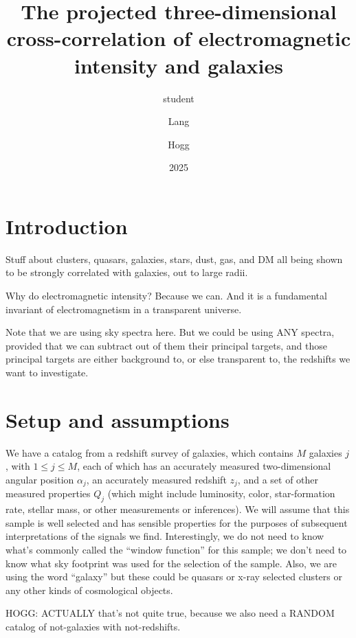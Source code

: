 \documentclass{article}
\title{\bfseries%
The projected three-dimensional cross-correlation of electromagnetic intensity and galaxies}
\author{student \and Lang \and Hogg}
\date{2025}
\begin{document}
\maketitle

\section{Introduction}
Stuff about clusters, quasars, galaxies, stars, dust, gas, and DM all being shown to be strongly correlated with galaxies, out to large radii.

Why do electromagnetic intensity? Because we can. And it is a fundamental invariant of electromagnetism in a transparent universe.

Note that we are using sky spectra here. But we could be using ANY spectra, provided that we can subtract out of them their principal targets, and those principal targets are either background to, or else transparent to, the redshifts we want to investigate.

\section{Setup and assumptions}
We have a catalog from a redshift survey of galaxies, which contains $M$ galaxies $j$, with $1\leq j\leq M$, each of which has an accurately measured two-dimensional angular position $\alpha_j$, an accurately measured redshift $z_j$, and a set of other measured properties $Q_j$ (which might include luminosity, color, star-formation rate, stellar mass, or other measurements or inferences).
We will assume that this sample is well selected and has sensible properties for the purposes of subsequent interpretations of the signals we find.
Interestingly, we do not need to know what's commonly called the ``window function'' for this sample; we don't need to know what sky footprint was used for the selection of the sample.
Also, we are using the word ``galaxy'' but these could be quasars or x-ray selected clusters or any other kinds of cosmological objects.

HOGG: ACTUALLY that's not quite true, because we also need a RANDOM catalog of not-galaxies with not-redshifts.
\end{document}
